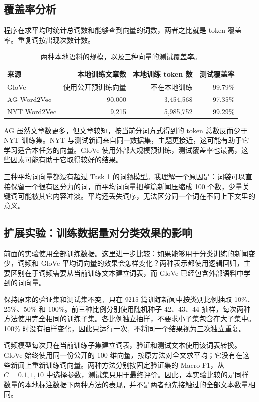 \documentclass[12pt, a4paper, fontset=fandol]{ctexart}
\begin{document}
\subsection{覆盖率分析}
程序在求平均时统计总词数和能够查到向量的词数，两者之比就是 token 覆盖率。重复词按出现次数计数。
\begin{table}[H]\centering\small
\begin{tabular}{lrrr}\hline\hline
来源 & 本地训练文章数 & 本地训练 token 数 & 测试覆盖率\\\hline
GloVe & 使用公开预训练向量 & 不在本地训练 & 99.79\%\\
AG Word2Vec & 90,000 & 3,454,568 & 97.35\%\\
NYT Word2Vec & 9,215 & 5,985,752 & 99.29\%\\\hline\hline
\end{tabular}
\caption{两种本地语料的规模，以及三种向量的测试覆盖率。}
\end{table}
AG 虽然文章数更多，但文章较短，按当前分词方式得到的 token 总数反而少于 NYT 训练集。NYT 与测试新闻来自同一数据集，主题更接近，这可能有助于它学习适合本任务的向量。GloVe 使用外部大规模预训练，测试覆盖率也最高，这些因素可能有助于它取得较好的结果。

三种平均词向量都没有超过 Task 1 的词频模型。我理解一个原因是：词袋可以直接保留一个很有区分力的词，而平均词向量把整篇新闻压缩成 100 个数，少量关键词可能被其它内容冲淡。平均还丢失词序，无法区分同一个词在不同上下文里的意义。

\subsection{扩展实验：训练数据量对分类效果的影响}
前面的实验使用全部训练数据。这里进一步比较：如果能够用于分类训练的新闻变少，词频和 GloVe 平均词向量的效果会怎样变化？两种表示都使用逻辑回归，主要区别在于词频需要从当前训练文本建立词表，而 GloVe 已经包含外部语料中学到的词向量。

保持原来的验证集和测试集不变，只在 9215 篇训练新闻中按类别比例抽取 10\%、25\%、50\% 和 100\%。前三种比例分别使用随机种子 42、43、44 抽样，每次两种方法使用完全相同的训练子集。各比例独立抽样，不要求小子集包含在大子集中。100\% 时没有抽样变化，因此只运行一次，不将同一个结果视为三次独立重复。

词频模型每次只在当前训练子集建立词表，验证和测试文本使用该词表转换。GloVe 始终使用同一份公开的 100 维向量，按原方法对全文求平均；它没有在这些新闻上重新训练词向量。两种方法分别按固定验证集的 Macro-F1，从 $C=0.1,1,10$ 中选择参数，测试集只用于最终评价。因此，本实验比较的是同样数量的本地标注数据下两种方法的表现，并不是两者预先接触过的全部文本数量相同。
\end{document}
